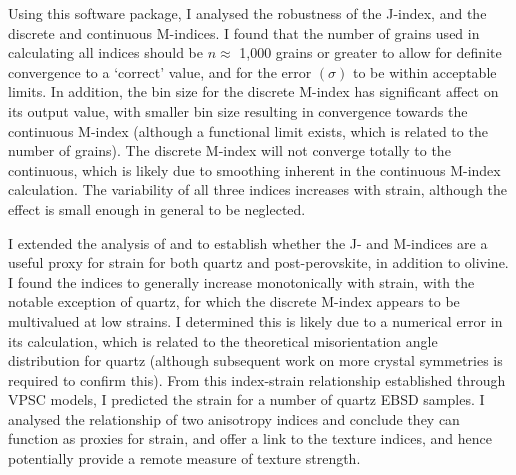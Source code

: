 \documentclass[a4paper,12pt,twoside]{report}
\numberwithin{equation}{chapter}
\begin{document}
Using this software package, I analysed the robustness of the J-index, and the discrete and continuous M-indices. I found that the number of grains used in calculating all indices should be $n \approx$ 1,000 grains or greater to allow for definite convergence to a \lq{}correct\rq{} value, and for the error $(\sigma)$ to be within acceptable limits. In addition, the bin size for the discrete M-index has significant affect on its output value, with smaller bin size resulting in convergence towards the continuous M-index (although a functional limit exists, which is related to the number of grains). The discrete M-index will not converge totally to the continuous, which is likely due to smoothing inherent in the continuous M-index calculation. The variability of all three indices increases with strain, although the effect is small enough in general to be neglected.

I extended the analysis of \cite{Skemer} and \cite{Mainprice} to establish whether the J- and M-indices are a useful proxy for strain for both quartz and post-perovskite, in addition to olivine. I found the indices to generally increase monotonically with strain, with the notable exception of quartz, for which the discrete M-index appears to be multivalued at low strains. I determined this is likely due to a numerical error in its calculation, which is related to the theoretical misorientation angle distribution for quartz (although subsequent work on more crystal symmetries is required to confirm this). From this index-strain relationship established through VPSC models, I predicted the strain for a number of quartz EBSD samples. I analysed the relationship of two anisotropy indices and conclude they can function as proxies for strain, and offer a link to the texture indices, and hence potentially provide a remote measure of texture strength.






\newpage
\appendix
\renewcommand{\thesection}{\Roman{section}}
\end{document}
